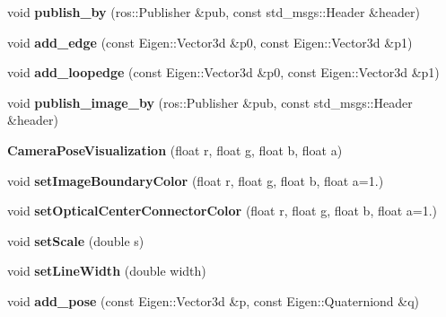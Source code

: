 \begin{DoxyCompactItemize}
void {\bfseries publish\+\_\+by} (ros\+::\+Publisher \&pub, const std\+\_\+msgs\+::\+Header \&header)
\item 
\mbox{\label{classCameraPoseVisualization_a2e3e88742eff639180ba89e2f25ee04f}} 
void {\bfseries add\+\_\+edge} (const Eigen\+::\+Vector3d \&p0, const Eigen\+::\+Vector3d \&p1)
\item 
\mbox{\label{classCameraPoseVisualization_a632e29693827194f8d16afb426992bce}} 
void {\bfseries add\+\_\+loopedge} (const Eigen\+::\+Vector3d \&p0, const Eigen\+::\+Vector3d \&p1)
\item 
\mbox{\label{classCameraPoseVisualization_a0ee421fa2b43cba8addbe508a7c6c8d1}} 
void {\bfseries publish\+\_\+image\+\_\+by} (ros\+::\+Publisher \&pub, const std\+\_\+msgs\+::\+Header \&header)
\item 
\mbox{\label{classCameraPoseVisualization_ab0900a96947ea4a31603c99253d3e8a2}} 
{\bfseries Camera\+Pose\+Visualization} (float r, float g, float b, float a)
\item 
\mbox{\label{classCameraPoseVisualization_ad0077b4ae7856a219648e698b0e19583}} 
void {\bfseries set\+Image\+Boundary\+Color} (float r, float g, float b, float a=1.)
\item 
\mbox{\label{classCameraPoseVisualization_a97ba9b67388cbec777ba699cb9b16b60}} 
void {\bfseries set\+Optical\+Center\+Connector\+Color} (float r, float g, float b, float a=1.)
\item 
\mbox{\label{classCameraPoseVisualization_ad80a8caac209f5c8152a11d76a7bdb13}} 
void {\bfseries set\+Scale} (double s)
\item 
\mbox{\label{classCameraPoseVisualization_aaff71a7169d94c3430b2720be940e34f}} 
void {\bfseries set\+Line\+Width} (double width)
\item 
\mbox{\label{classCameraPoseVisualization_acd8c3319206d898250db48154bd4712b}} 
void {\bfseries add\+\_\+pose} (const Eigen\+::\+Vector3d \&p, const Eigen\+::\+Quaterniond \&q)

\end{DoxyCompactItemize}
